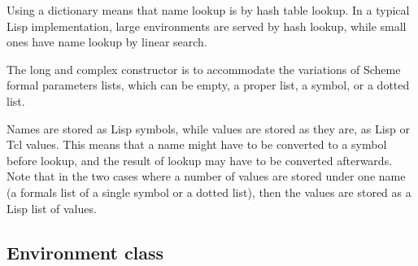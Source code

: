 \documentclass[twoside]{report}
\begin{document}
Using a dictionary means that name lookup is by hash table lookup. In a typical Lisp implementation, large environments are served by hash lookup, while small ones have name lookup by linear search.

The long and complex constructor is to accommodate the variations of Scheme formal parameters lists, which can be empty, a proper list, a symbol, or a dotted list.

Names are stored as Lisp symbols, while values are stored as they are, as Lisp or Tcl values. This means that a name might have to be converted to a symbol before lookup, and the result of lookup may have to be converted afterwards. Note that in the two cases where a number of values are stored under one name (a formals list of a single symbol or a dotted list), then the values are stored as a Lisp list of values.

\subsection{Environment class}
\label{environment-class}
\end{document}

